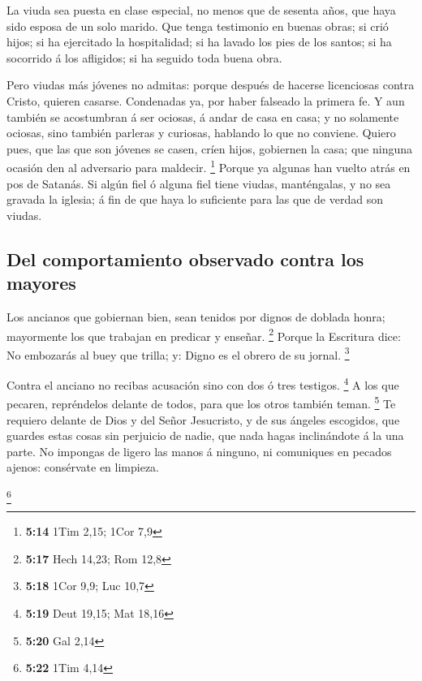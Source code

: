  La viuda sea puesta en clase especial, no menos que de
sesenta años, que haya sido esposa de un solo marido.  Que
tenga testimonio en buenas obras; si crió hijos; si ha ejercitado la
hospitalidad; si ha lavado los pies de los santos; si ha socorrido á los
afligidos; si ha seguido toda buena obra.

 Pero viudas más jóvenes no admitas: porque después de
hacerse licenciosas contra Cristo, quieren casarse. 
Condenadas ya, por haber falseado la primera fe.  Y aun
también se acostumbran á ser ociosas, á andar de casa en casa; y no
solamente ociosas, sino también parleras y curiosas, hablando lo que no
conviene.  Quiero pues, que las que son jóvenes se casen,
críen hijos, gobiernen la casa; que ninguna ocasión den al adversario
para maldecir. \footnote{\textbf{5:14} 1Tim 2,15; 1Cor 7,9}
 Porque ya algunas han vuelto atrás en pos de Satanás.
 Si algún fiel ó alguna fiel tiene viudas, manténgalas, y
no sea gravada la iglesia; á fin de que haya lo suficiente para las que
de verdad son viudas.

\hypertarget{del-comportamiento-observado-contra-los-mayores}{%
\subsection{Del comportamiento observado contra los
mayores}\label{del-comportamiento-observado-contra-los-mayores}}

 Los ancianos que gobiernan bien, sean tenidos por dignos
de doblada honra; mayormente los que trabajan en predicar y enseñar.
\footnote{\textbf{5:17} Hech 14,23; Rom 12,8}  Porque la
Escritura dice: No embozarás al buey que trilla; y: Digno es el obrero
de su jornal. \footnote{\textbf{5:18} 1Cor 9,9; Luc 10,7}

 Contra el anciano no recibas acusación sino con dos ó tres
testigos. \footnote{\textbf{5:19} Deut 19,15; Mat 18,16}  A
los que pecaren, repréndelos delante de todos, para que los otros
también teman. \footnote{\textbf{5:20} Gal 2,14}  Te
requiero delante de Dios y del Señor Jesucristo, y de sus ángeles
escogidos, que guardes estas cosas sin perjuicio de nadie, que nada
hagas inclinándote á la una parte.  No impongas de ligero
las manos á ninguno, ni comuniques en pecados ajenos: consérvate en
limpieza.

\footnote{\textbf{5:22} 1Tim 4,14}

